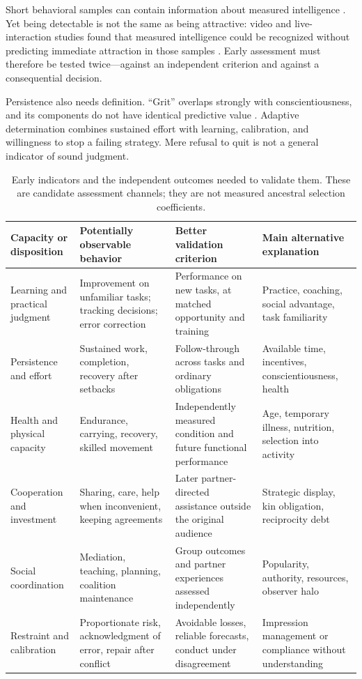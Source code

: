 \documentclass[10pt,twocolumn,letterpaper]{article}
\begin{document}
Short behavioral samples can contain information about measured intelligence \citep{borkenau2004}. Yet being detectable is not the same as being attractive: video and live-interaction studies found that measured intelligence could be recognized without predicting immediate attraction in those samples \citep{driebe2021}. Early assessment must therefore be tested twice---against an independent criterion and against a consequential decision.

Persistence also needs definition. ``Grit'' overlaps strongly with conscientiousness, and its components do not have identical predictive value \citep{grit}. Adaptive determination combines sustained effort with learning, calibration, and willingness to stop a failing strategy. Mere refusal to quit is not a general indicator of sound judgment.

\begin{table}[t]
\caption{Early indicators and the independent outcomes needed to validate them. These are candidate assessment channels; they are not measured ancestral selection coefficients.}
\label{tab:indicators}
\small\begin{tabularx}{\textwidth}{L{.17\textwidth}Y Y Y}
\toprule
Capacity or disposition & Potentially observable behavior & Better validation criterion & Main alternative explanation\\
\midrule
Learning and practical judgment & Improvement on unfamiliar tasks; tracking decisions; error correction & Performance on new tasks, at matched opportunity and training & Practice, coaching, social advantage, task familiarity\\
Persistence and effort & Sustained work, completion, recovery after setbacks & Follow-through across tasks and ordinary obligations & Available time, incentives, conscientiousness, health\\
Health and physical capacity & Endurance, carrying, recovery, skilled movement & Independently measured condition and future functional performance & Age, temporary illness, nutrition, selection into activity\\
Cooperation and investment & Sharing, care, help when inconvenient, keeping agreements & Later partner-directed assistance outside the original audience & Strategic display, kin obligation, reciprocity debt\\
Social coordination & Mediation, teaching, planning, coalition maintenance & Group outcomes and partner experiences assessed independently & Popularity, authority, resources, observer halo\\
Restraint and calibration & Proportionate risk, acknowledgment of error, repair after conflict & Avoidable losses, reliable forecasts, conduct under disagreement & Impression management or compliance without understanding\\
\bottomrule
\end{tabularx}
\end{table}
\end{document}
